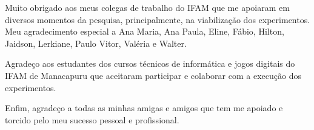 {Muito obrigado aos meus colegas de trabalho do IFAM que me apoiaram em diversos momentos da pesquisa, principalmente, na viabilização dos experimentos. Meu agradecimento especial a Ana Maria, Ana Paula, Eline, Fábio, Hilton, Jaidson, Lerkiane, Paulo Vitor, Valéria e Walter.

Agradeço aos estudantes dos cursos técnicos de informática e jogos digitais do IFAM de Manacapuru que aceitaram participar e colaborar com a execução dos experimentos.

Enfim, agradeço a todas as minhas amigas e amigos que tem me apoiado e torcido pelo meu sucesso pessoal e profissional.


}